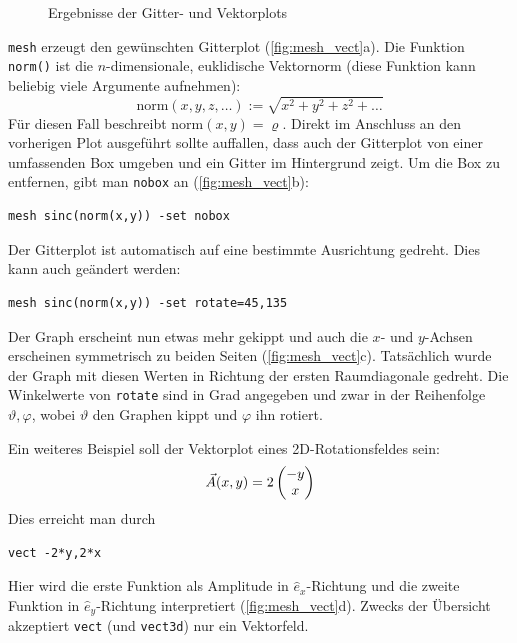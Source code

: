 \documentclass[DIV=14,headsepline,footsepline]{scrbook}
\begin{document}
\begin{figure}[p]
					\caption{Ergebnisse der Gitter- und Vektorplots}
					\label{fig:mesh_vect}
				\end{figure}
				\verb+mesh+ erzeugt den gewünschten Gitterplot (\autoref{fig:mesh_vect}a). Die Funktion \verb+norm()+ ist die $n$-dimensionale, euklidische Vektornorm (diese Funktion kann beliebig viele Argumente aufnehmen):
				\begin{equation*}
					\text{norm}(x,y,z,\ldots) := \sqrt{x^2+y^2+z^2+\ldots}
				\end{equation*}
				Für diesen Fall beschreibt $\text{norm}(x,y) = \varrho$. Direkt im Anschluss an den vorherigen Plot ausgeführt sollte auffallen, dass auch der Gitterplot von einer umfassenden Box umgeben und ein Gitter im Hintergrund zeigt. Um die Box zu entfernen, gibt man \verb+nobox+ an (\autoref{fig:mesh_vect}b):
				\begin{lstlisting}
mesh sinc(norm(x,y)) -set nobox
				\end{lstlisting}
				
				Der Gitterplot ist automatisch auf eine bestimmte Ausrichtung gedreht. Dies kann auch geändert werden:
				\begin{lstlisting}
mesh sinc(norm(x,y)) -set rotate=45,135
				\end{lstlisting}
				Der Graph erscheint nun etwas mehr gekippt und auch die $x$- und $y$-Achsen erscheinen symmetrisch zu beiden Seiten (\autoref{fig:mesh_vect}c). Tatsächlich wurde der Graph mit diesen Werten in Richtung der ersten Raumdiagonale gedreht. Die Winkelwerte von \verb+rotate+ sind in Grad angegeben und zwar in der Reihenfolge $\vartheta,\varphi$, wobei $\vartheta$ den Graphen kippt und $\varphi$ ihn rotiert.
				
				Ein weiteres Beispiel soll der Vektorplot eines 2D-Rotationsfeldes sein:
				\[\vec A(x,y) = 2\begin{pmatrix} -y\\x \end{pmatrix}\]
				Dies erreicht man durch
				\begin{lstlisting}
vect -2*y,2*x
				\end{lstlisting}
				Hier wird die erste Funktion als Amplitude in $\hat e_x$-Richtung und die zweite Funktion in $\hat e_y$-Richtung interpretiert (\autoref{fig:mesh_vect}d). Zwecks der Übersicht akzeptiert \verb+vect+ (und \verb+vect3d+) nur ein Vektorfeld.
				
\end{document}
